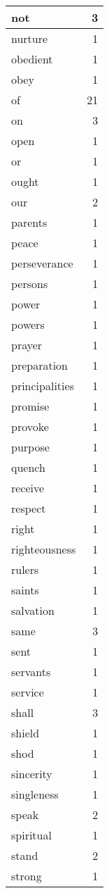 \begin{center}
\begin{longtable}{l|r}
not & 3\\ \hline 
nurture & 1\\ \hline 
obedient & 1\\ \hline 
obey & 1\\ \hline 
of & 21\\ \hline 
on & 3\\ \hline 
open & 1\\ \hline 
or & 1\\ \hline 
ought & 1\\ \hline 
our & 2\\ \hline 
parents & 1\\ \hline 
peace & 1\\ \hline 
perseverance & 1\\ \hline 
persons & 1\\ \hline 
power & 1\\ \hline 
powers & 1\\ \hline 
prayer & 1\\ \hline 
preparation & 1\\ \hline 
principalities & 1\\ \hline 
promise & 1\\ \hline 
provoke & 1\\ \hline 
purpose & 1\\ \hline 
quench & 1\\ \hline 
receive & 1\\ \hline 
respect & 1\\ \hline 
right & 1\\ \hline 
righteousness & 1\\ \hline 
rulers & 1\\ \hline 
saints & 1\\ \hline 
salvation & 1\\ \hline 
same & 3\\ \hline 
sent & 1\\ \hline 
servants & 1\\ \hline 
service & 1\\ \hline 
shall & 3\\ \hline 
shield & 1\\ \hline 
shod & 1\\ \hline 
sincerity & 1\\ \hline 
singleness & 1\\ \hline 
speak & 2\\ \hline 
spiritual & 1\\ \hline 
stand & 2\\ \hline 
strong & 1\\ \hline 

\end{longtable}
\end{center}
